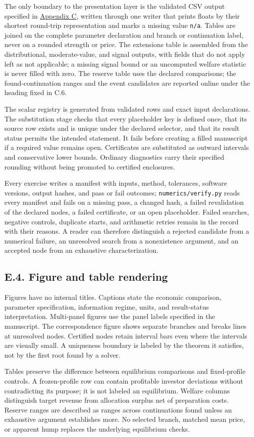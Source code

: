 \documentclass[
  11pt,
]{article}
\newcounter{none} %
\begin{document}
The only boundary to the presentation layer is the validated CSV output
specified in \hyperref[oa-c]{Appendix C}, written through one writer
that prints floats by their shortest round-trip representation and marks
a missing value \texttt{n/a}. Tables are joined on the complete
parameter declaration and branch or continuation label, never on a
rounded strength or price. The extensions table is assembled from the
distributional, moderate-value, and signal outputs, with fields that do
not apply left as not applicable; a missing signal bound or an
uncomputed welfare statistic is never filled with zero. The reserve
table uses the declared comparisons; the found-continuation ranges and
the event candidates are reported online under the heading fixed in C.6.

The scalar registry is generated from validated rows and exact input
declarations. The substitution stage checks that every placeholder key
is defined once, that its source row exists and is unique under the
declared selector, and that its result status permits the intended
statement. It fails before creating a filled manuscript if a required
value remains open. Certificates are substituted as outward intervals
and conservative lower bounds. Ordinary diagnostics carry their
specified rounding without being promoted to certified enclosures.

Every exercise writes a manifest with inputs, method, tolerances,
software versions, output hashes, and pass or fail outcomes;
\texttt{numerics/verify.py} reads every manifest and fails on a missing
pass, a changed hash, a failed revalidation of the declared nodes, a
failed certificate, or an open placeholder. Failed searches, negative
controls, duplicate starts, and arithmetic retries remain in the record
with their reasons. A reader can therefore distinguish a rejected
candidate from a numerical failure, an unresolved search from a
nonexistence argument, and an accepted node from an exhaustive
characterization.

\subsection{E.4. Figure and table rendering}\label{oa-e-rendering}

Figures have no internal titles. Captions state the economic comparison,
parameter specification, information regime, units, and result-status
interpretation. Multi-panel figures use the panel labels specified in
the manuscript. The correspondence figure shows separate branches and
breaks lines at unresolved nodes. Certified nodes retain interval bars
even where the intervals are visually small. A uniqueness boundary is
labeled by the theorem it satisfies, not by the first root found by a
solver.

Tables preserve the difference between equilibrium comparisons and
fixed-profile controls. A frozen-profile row can contain profitable
investor deviations without contradicting its purpose; it is not labeled
an equilibrium. Welfare columns distinguish target revenue from
allocation surplus net of preparation costs. Reserve ranges are
described as ranges across continuations found unless an exhaustive
argument establishes more. No selected branch, matched mean price, or
apparent hump replaces the underlying equilibrium checks.
\end{document}
